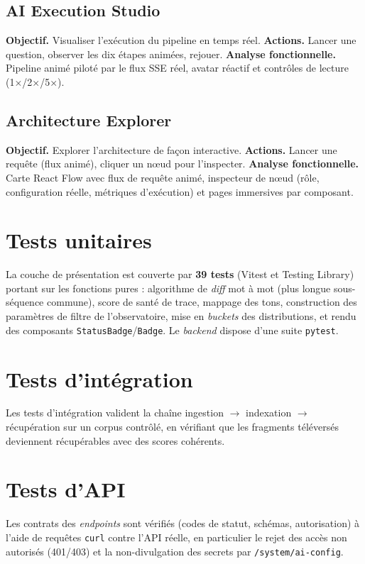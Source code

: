 \subsection{AI Execution Studio}
\textbf{Objectif.} Visualiser l'exécution du pipeline en temps réel.
\textbf{Actions.} Lancer une question, observer les dix étapes animées, rejouer.
\textbf{Analyse fonctionnelle.} Pipeline animé piloté par le flux SSE réel, avatar
réactif et contrôles de lecture (1×/2×/5×).

\subsection{Architecture Explorer}
\textbf{Objectif.} Explorer l'architecture de façon interactive. \textbf{Actions.}
Lancer une requête (flux animé), cliquer un n{\oe}ud pour l'inspecter.
\textbf{Analyse fonctionnelle.} Carte React Flow avec flux de requête animé,
inspecteur de n{\oe}ud (rôle, configuration réelle, métriques d'exécution) et
pages immersives par composant.

\section{Tests unitaires}
La couche de présentation est couverte par \textbf{39 tests} (Vitest et Testing
Library) portant sur les fonctions pures : algorithme de \emph{diff} mot à mot
(plus longue sous-séquence commune), score de santé de trace, mappage des tons,
construction des paramètres de filtre de l'observatoire, mise en \emph{buckets}
des distributions, et rendu des composants \texttt{StatusBadge}/\texttt{Badge}. Le
\emph{backend} dispose d'une suite \texttt{pytest}.


\section{Tests d'intégration}
Les tests d'intégration valident la chaîne ingestion $\rightarrow$ indexation
$\rightarrow$ récupération sur un corpus contrôlé, en vérifiant que les fragments
téléversés deviennent récupérables avec des scores cohérents.

\section{Tests d'API}
Les contrats des \emph{endpoints} sont vérifiés (codes de statut, schémas,
autorisation) à l'aide de requêtes \texttt{curl} contre l'API réelle, en
particulier le rejet des accès non autorisés (401/403) et la non-divulgation des
secrets par \texttt{/system/ai-config}.

